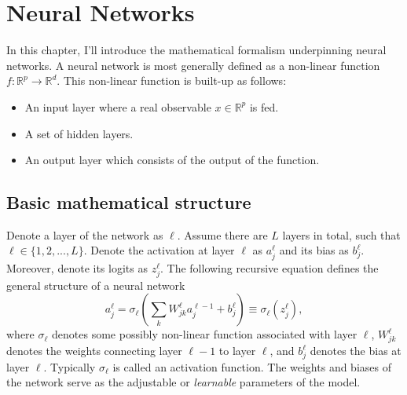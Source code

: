 \section{Neural Networks}\label{sec:neural_networks}
In this chapter, I'll introduce the mathematical formalism underpinning
neural networks.
A neural network is most generally defined as a non-linear function $f : \mathbb{R}^p \to \mathbb{R}^d$. This non-linear function is built-up as follows:
\begin{itemize}
    \item An input layer where a real observable $x \in \mathbb{R}^p$ is fed.
    \item A set of hidden layers.
    \item An output layer which consists of the output of the function.
\end{itemize}

\subsection{Basic mathematical structure}
Denote a layer of the network as $\ell$. Assume there are $L$ layers in total, such that $\ell \in \{1,2,...,L\}$. Denote the activation at layer $\ell$ as $a_j^\ell$ and its bias as $b_j^\ell$. Moreover, denote its logits as $z_j^\ell$. The following recursive equation defines the general structure of a neural network
\begin{equation}
    a_j^\ell = \sigma_\ell \left(\sum_k W_{jk}^\ell a_j^{\ell - 1} + b_j^\ell\right) \equiv \sigma_\ell(z_j^\ell), 
\end{equation}
where $\sigma_\ell$ denotes some possibly non-linear function associated with layer $\ell$, $W_{jk}^\ell$ denotes the weights connecting layer $\ell-1$ to layer $\ell$, and $b_j^\ell$ denotes the bias at layer $\ell$. Typically $\sigma_\ell$ is called an activation function. The weights and biases of the network serve as the adjustable or \textit{learnable} parameters of the model.

